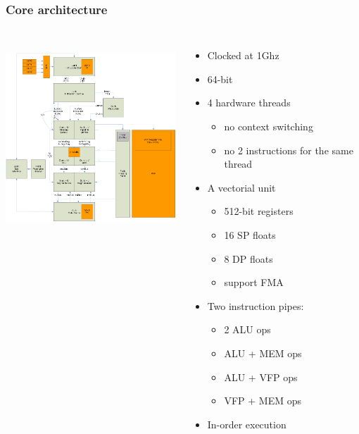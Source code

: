 \documentclass{beamer}
\begin{document}
\begin{frame}
  \frametitle{Core architecture}
  \begin{columns}
    \column{20em}
    \includegraphics[width=20em,height=20em]{slides-figures/MIC-core.png}%
    \column{12em}
    \begin{itemize}
      \small
    \item Clocked at 1Ghz
    \item 64-bit
    \item 4 hardware threads
      \begin{itemize}
        \footnotesize
        \item no context switching
        \item no 2 instructions for the same thread
      \end{itemize}
    \item A vectorial unit
      \begin{itemize}
        \footnotesize
        \item 512-bit registers
        \item 16 SP floats
        \item 8 DP floats
        \item support FMA
      \end{itemize}
    \item Two instruction pipes:
      \begin{itemize}
        \footnotesize
        \item 2 ALU ops
        \item ALU + MEM ops
        \item ALU + VFP ops
        \item VFP + MEM ops
      \end{itemize}
    \item In-order execution
    \end{itemize}
  \end{columns}
\end{frame}
\end{document}
